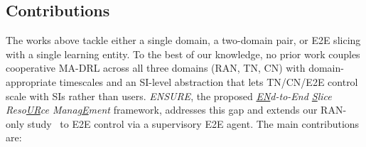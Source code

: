 \documentclass[12pt,lettersize,journal,onecolumn]{IEEEtran}
\begin{document}
\subsection{Contributions} \label{contribution-section}
The works above tackle either a single domain, a two-domain pair, or E2E slicing with a single learning entity. To the best of our knowledge, no prior work couples cooperative MA-DRL across all three domains (RAN, TN, CN) with domain-appropriate timescales and an SI-level abstraction that lets TN/CN/E2E control scale with SIs rather than users. \textit{ENSURE}, the proposed \textit{\underline{EN}d-to-End \underline{S}lice Reso\underline{UR}ce Manag\underline{E}ment} framework, addresses this gap and extends our RAN-only study~\cite{camad24ebrahimi} to E2E control via a supervisory E2E agent. The main contributions are:
\end{document}

